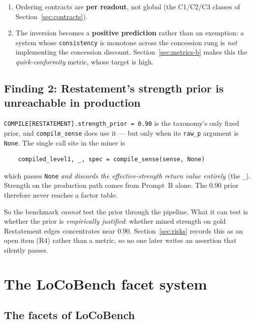 \documentclass[11pt]{article}
\newcommand{\readout}[1]{\texttt{#1}}
\begin{document}
\begin{enumerate}[leftmargin=*,nosep,label=(\arabic*)]
  \item Ordering contracts are \textbf{per readout}, not global (the C1/C2/C3 classes of
        Section~\ref{sec:contracts}).
  \item The inversion becomes a \textbf{positive prediction} rather than an exemption: a
        system whose \readout{consistency} is monotone across the concession rung is
        \emph{not} implementing the concession discount. Section~\ref{sec:metrics-b} makes
        this the \emph{quirk-conformity} metric, whose target is high.
\end{enumerate}

\subsection{Finding 2: Restatement's strength prior is unreachable in production}
\label{sec:finding-prior}

\texttt{COMPILE[RESTATEMENT].strength\_prior = 0.90} is the taxonomy's only fixed prior, and
\texttt{compile\_sense} does use it --- but only when its \texttt{raw\_p} argument is
\texttt{None}. The single call site in the miner is
\begin{verbatim}
    compiled_level1, _, spec = compile_sense(sense, None)
\end{verbatim}
which passes \texttt{None} \emph{and discards the effective-strength return value entirely}
(the \texttt{\_}). Strength on the production path comes from Prompt~B alone. The $0.90$
prior therefore never reaches a factor table.

So the benchmark \emph{cannot} test the prior through the pipeline. What it can test is
whether the prior is \emph{empirically justified}: whether mined strength on gold Restatement
edges concentrates near $0.90$. Section~\ref{sec:risks} records this as an open item (R4)
rather than a metric, so no one later writes an assertion that silently passes.

\section{The LoCoBench facet system}
\label{sec:facets}

\subsection{The facets of LoCoBench}
\label{sec:facetlist}
\end{document}
